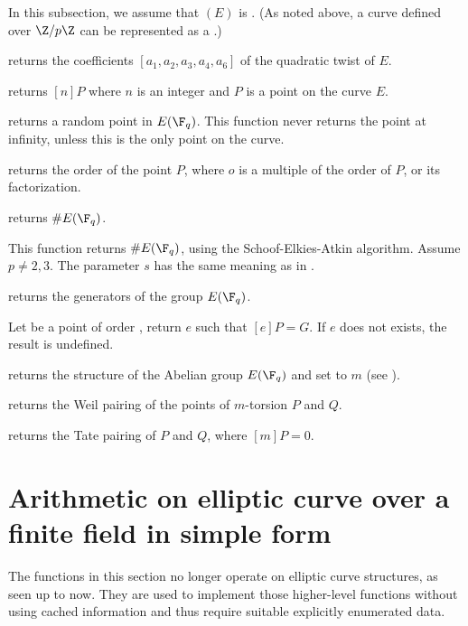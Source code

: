 In this subsection, we assume that $(E)$ is .
(As noted above, a curve defined over $\Z/p\Z$ can be represented as a
.)

 returns the coefficients
$[a_1,a_2,a_3,a_4,a_6]$ of the quadratic twist of $E$.

 returns $[n]P$ where $n$ is an
integer and $P$ is a point on the curve $E$.

 returns a random point in $E(\F_q)$.
This function never returns the point at infinity, unless this is the
only point on the curve.

 returns the order of the point
$P$, where $o$ is a multiple of the order of $P$, or its factorization.

 returns $\#E(\F_q)$.

This function returns $\#E(\F_q)$, using the Schoof-Elkies-Atkin
algorithm.  Assume $p\neq 2,3$.
The parameter $s$ has the same meaning as in .

 returns the generators of the group $E(\F_q)$.

 Let  be a point of
order , return $e$ such that $[e]P=G$. If $e$ does not exists, the
result is undefined.

 returns the structure of the Abelian
group $E(\F_q)$ and set  to $m$ (see ).

 returns the
Weil pairing of the points of $m$-torsion $P$ and $Q$.

 returns the Tate
pairing of $P$ and $Q$, where $[m]P = 0$.

\section{Arithmetic on elliptic curve over a finite field in simple form}

The functions in this section no longer operate on elliptic curve structures,
as seen up to now. They are used to implement those higher-level functions
without using cached information and thus require suitable explicitly
enumerated data.

